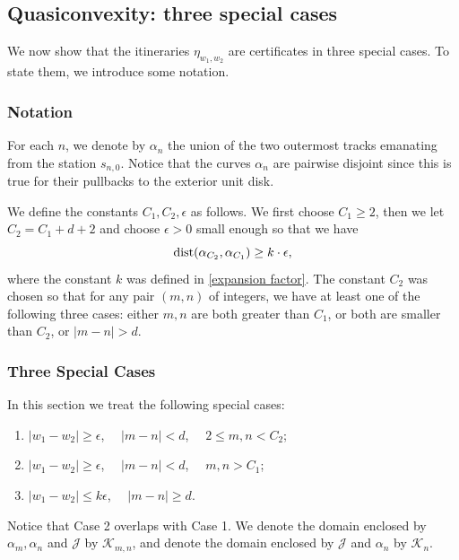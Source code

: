 \subsection{Quasiconvexity: three special cases}

We now show that the itineraries $\eta_{w_1,w_2}$ are certificates in three special cases. To state them, we introduce some notation.

\subsubsection{Notation}

For each $n$, we denote by  $\alpha_n$ the union of the two outermost tracks emanating from the station $s_{n,0}$. 
Notice that the curves $\alpha_n$ are pairwise disjoint since this is true for their pullbacks to the exterior unit disk.

We define the constants $C_1, C_2, \epsilon$ as follows. We first choose $C_1 \ge 2$, then we let $C_2 = C_1 + d+2$ and choose $\epsilon >0$ small enough so that we have 
\begin{equation}
	\operatorname{dist}(\alpha_{C_2}, \alpha_{C_1}) \geq k \cdot \epsilon,
\end{equation}
where the constant $k$ was defined in \cref{expansion factor}.
The constant $C_2$ was chosen so that for any pair $(m,n)$ of integers, we have at least one of the following three cases: either $m,n$ are both greater than $C_1$, or both are smaller than $C_2$, or $|m-n| > d$.

\subsubsection{Three Special Cases}
In this section we treat the following special cases:
\begin{enumerate}
	\item $|w_1-w_2| \geq  \epsilon$, $\quad |m-n|<d$, $\quad 2 \le m,n < C_2$; %
	\item $|w_1-w_2| \geq \epsilon$, $\quad |m-n|<d$, $\quad  m,n> C_1$; %
	\item $|w_1-w_2| \leq k \epsilon$, $\quad |m-n| \geq d$.
\end{enumerate}

Notice that Case 2 overlaps with Case 1.
 We denote the domain enclosed by $\alpha_m, \alpha_n$ and $\mathcal J$ by $\mathcal K_{m,n}$, and denote the domain enclosed by $\mathcal J$ and $\alpha_n$ by $\mathcal K_n$.


